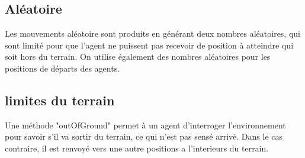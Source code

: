 \subsection{Aléatoire}
Les mouvements aléatoire sont produits en générant deux nombres
aléatoires, qui sont limité pour que l'agent ne puissent pas recevoir
de position à atteindre qui soit hors du terrain.  On utilise
également des nombres aléatoires pour les positions de départs des
agents.

\subsection{limites du terrain}

Une méthode "outOfGround" permet à un agent d'interroger
l'environnement pour savoir s'il va sortir du terrain, ce qui n'est
pas sensé arrivé. Dans le cas contraire, il est renvoyé vers une autre
positions a l'interieurs du terrain.
